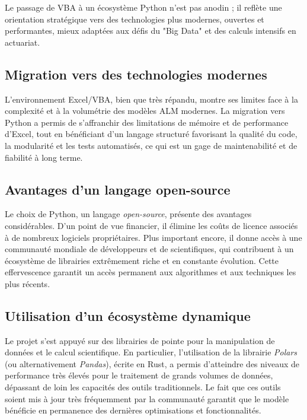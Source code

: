 Le passage de VBA à un écosystème Python n'est pas anodin ; il reflète une orientation stratégique vers des technologies plus modernes, ouvertes et performantes, mieux adaptées aux défis du "Big Data" et des calculs intensifs en actuariat.

\subsection{Migration vers des technologies modernes}
L'environnement Excel/VBA, bien que très répandu, montre ses limites face à la complexité et à la volumétrie des modèles ALM modernes. La migration vers Python a permis de s'affranchir des limitations de mémoire et de performance d'Excel, tout en bénéficiant d'un langage structuré favorisant la qualité du code, la modularité et les tests automatisés, ce qui est un gage de maintenabilité et de fiabilité à long terme.

\subsection{Avantages d'un langage open-source}
Le choix de Python, un langage \textit{open-source}, présente des avantages considérables. D'un point de vue financier, il élimine les coûts de licence associés à de nombreux logiciels propriétaires. Plus important encore, il donne accès à une communauté mondiale de développeurs et de scientifiques, qui contribuent à un écosystème de librairies extrêmement riche et en constante évolution. Cette effervescence garantit un accès permanent aux algorithmes et aux techniques les plus récents.

\subsection{Utilisation d'un écosystème dynamique}
Le projet s'est appuyé sur des librairies de pointe pour la manipulation de données et le calcul scientifique. En particulier, l'utilisation de la librairie \textit{Polars} (ou alternativement \textit{Pandas}), écrite en Rust, a permis d'atteindre des niveaux de performance très élevés pour le traitement de grands volumes de données, dépassant de loin les capacités des outils traditionnels. Le fait que ces outils soient mis à jour très fréquemment par la communauté garantit que le modèle bénéficie en permanence des dernières optimisations et fonctionnalités.

